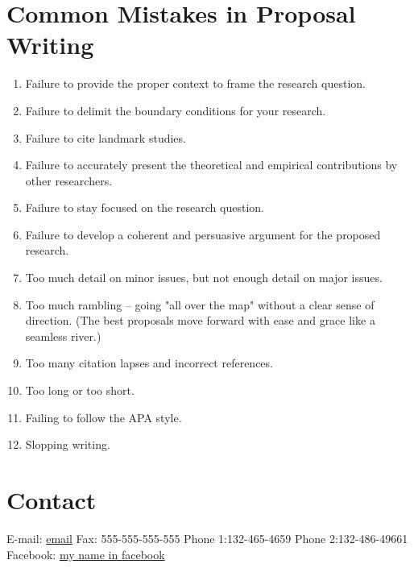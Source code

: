 \documentclass[a4paper, 12pt]{article}
\begin{document}
\section*{Common Mistakes in Proposal Writing}
\begin{enumerate}
	\item Failure to provide the proper context to frame the research question.
	\item Failure to delimit the boundary conditions for your research.
	\item Failure to cite landmark studies.
	\item Failure to accurately present the theoretical and empirical contributions by other researchers.
	\item Failure to stay focused on the research question.
	\item Failure to develop a coherent and persuasive argument for the proposed research.
	\item Too much detail on minor issues, but not enough detail on major issues.
	\item Too much rambling -- going "all over the map" without a clear sense of direction. (The best proposals move forward with ease and grace like a seamless river.)
	\item Too many citation lapses and incorrect references.
	\item Too long or too short.
	\item Failing to follow the APA style.
	\item Slopping writing.
\end{enumerate}
\section*{Contact}

E-mail: \href{youremail@mail.com}{email} \newline
Fax: 555-555-555-555\newline
Phone 1:132-465-4659\newline
Phone 2:132-486-49661 \newline
Facebook: \href{https://www.facebook.com/}{my name in facebook}



\newpage
\nocite{york}
\nocite{wong2016write}
\nocite{sudheesh2016write}
\nocite{nte2006research}
\nocite{iqbal2007learning}
\printbibliography
\end{document}

